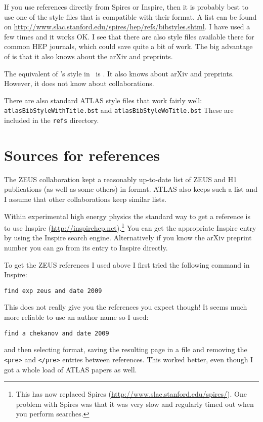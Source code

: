 If you use references directly from Spires or Inspire, then it is
probably best to use one of the style files that is compatible with
their format. A list can be found on
\url{http://www.slac.stanford.edu/spires/hep/refs/bibstyles.shtml}. I
have used  a few times and it works OK. I see that
there are also style files available there for common HEP journals,
which could save quite a bit of work. The big advantage of
 is that it also knows about the arXiv and preprints.

The equivalent of 's  style in \BibTeX\ is
. It also knows about arXiv and preprints. However, it
does not know about collaborations.

There are also standard ATLAS style files that work fairly well:
\texttt{atlasBibStyleWithTitle.bst} and \texttt{atlasBibStyleWoTitle.bst}
These are included in the \texttt{refs} directory.


\section{Sources for references}
\label{sec:ref:sources}

The ZEUS collaboration kept a reasonably up-to-date list of ZEUS and
H1 publications (as well as some others) in \BibTeX{} format. ATLAS
also keeps such a list and I assume that other collaborations keep
similar lists.

Within experimental high energy physics the standard way to get a
reference is to use Inspire
(\url{http://inspirehep.net}).\footnote{This has now replaced Spires
(\url{http://www.slac.stanford.edu/spires/}).
One problem with Spires was that it was very slow and regularly
timed out when you perform searches.} You can get the appropriate
Inspire entry by using the Inspire search engine. Alternatively if you
know the arXiv preprint number you can go from its entry to Inspire
directly.

To get the ZEUS references I used above I first tried the following
command in Inspire:
\begin{verbatim}
find exp zeus and date 2009
\end{verbatim}
This does not really give you the references you expect though! It
seems much more reliable to use an author name so I used:
\begin{verbatim}
find a chekanov and date 2009
\end{verbatim}
and then selecting \BibTeX{} format, saving the resulting page in a file
and removing the \texttt{<pre>} and \texttt{</pre>} entries between
references. This worked better, even though I got a whole load of
ATLAS papers as well.

